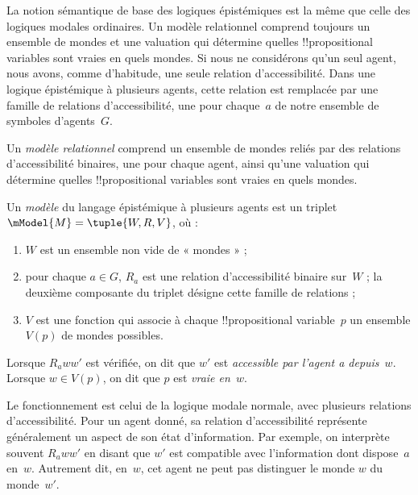 \documentclass[../../../include/open-logic-section]{subfiles}
\begin{document}


La notion sémantique de base des logiques épistémiques est la même
que celle des logiques modales ordinaires. Un modèle relationnel
comprend toujours un ensemble de mondes et une valuation qui détermine
quelles !!{propositional variable}s sont vraies en quels mondes.
Si nous ne considérons qu'un seul agent, nous avons, comme d'habitude,
une seule relation d'accessibilité. Dans une logique épistémique à
plusieurs agents, cette relation est remplacée par une famille de
relations d'accessibilité, une pour chaque~$a$ de notre ensemble de
symboles d'agents~$G$.

Un \emph{modèle relationnel} comprend un ensemble de mondes reliés
par des relations d'accessibilité binaires, une pour chaque agent,
ainsi qu'une valuation qui détermine quelles
!!{propositional variable}s sont vraies en quels mondes.

\begin{defn}
  Un \emph{modèle} du langage épistémique à plusieurs agents est un
  triplet $\mModel{M} = \tuple{W, R, V}$, où :
  \begin{enumerate}
  \item $W$ est un ensemble non vide de « mondes » ;
  \item pour chaque $a \in G$, ${R}_a$ est une relation
  d'accessibilité binaire sur~$W$ ; la deuxième composante du triplet
  désigne cette famille de relations ;
  \item $V$ est une fonction qui associe à chaque
  !!{propositional variable}~$p$ un ensemble $V(p)$ de mondes possibles.
  \end{enumerate}
  Lorsque $R_a ww'$ est vérifiée, on dit que $w'$ est
  \emph{accessible par l'agent a depuis}~$w$.
  Lorsque $w \in V(p)$, on dit que $p$ est \emph{vraie en}~$w$.
\end{defn}

Le fonctionnement est celui de la logique modale normale, avec
plusieurs relations d'accessibilité. Pour un agent donné, sa relation
d'accessibilité représente généralement un aspect de son état
d'information. Par exemple, on interprète souvent $R_a ww'$ en
disant que $w'$ est compatible avec l'information dont dispose~$a$
en~$w$. Autrement dit, en~$w$, cet agent ne peut pas distinguer le
monde $w$ du monde~$w'$.
\end{document}
